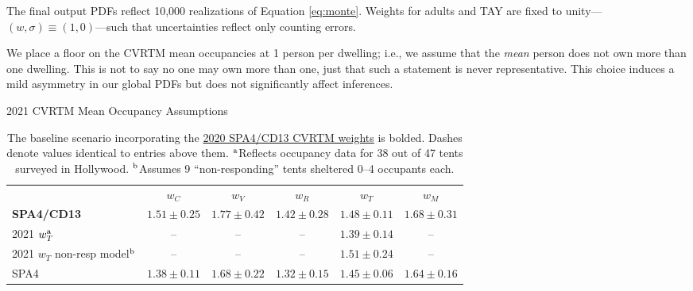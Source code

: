 \documentclass[11pt,twocolumn]{article}
\begin{document}
The final output PDFs reflect 10,000 realizations of Equation \ref{eq:monte}. Weights for 
adults and TAY are fixed to unity---$(w,\sigma)\equiv(1,0)$---such that uncertainties reflect only 
counting errors. 


We place a floor on the CVRTM mean occupancies at 1 person per dwelling; i.e., we assume that the 
{\it mean} person does not own more than one dwelling. This is not to say no one may own more than 
one, just that such a statement is never representative. This choice induces a mild asymmetry in our 
global PDFs but does not significantly affect inferences.

\begin{table}[t]
\centering
\caption{2021 CVRTM Mean Occupancy Assumptions}
\begin{tabular}{lccccc}
\toprule
 & $w_{C}$ & $w_{V}$ & $w_{R}$ & $w_{T}$ & $w_{M}$ \\ \cmidrule{1-6}
{\bf SPA4/CD13} & $1.51\pm0.25$ & $1.77\pm0.42$ & $1.42\pm0.28$ & $1.48\pm0.11$ & $1.68\pm0.31$ \\
2021 $w_{T}^{\rm a}$ & -- & -- & -- & $1.39\pm0.14$ & --\\
2021 $w_{T}$ non-resp model$^{\rm b}$ & -- & -- & --& $1.51\pm0.24$ & --\\
SPA4 & $1.38\pm0.11$ & $1.68\pm0.22$ & $1.32\pm0.15$ & $1.45\pm0.06$ & $1.64\pm0.16$\\
\bottomrule
\end{tabular}
\caption*{The baseline scenario incorporating the 
\href{https://www.lahsa.org/documents?id=4635-usc-2018-2020-multipliers-and-estimates-overview}
{2020 SPA4/CD13 CVRTM weights} is bolded. Dashes denote values identical to entries above them.
$^{\rm a}$Reflects occupancy data for 38 out of 47 tents surveyed in Hollywood. 
$^{\rm b}$Assumes 9 ``non-responding'' tents sheltered 0--4 occupants each.}
\label{tbl:weights}
\end{table}
\end{document}
